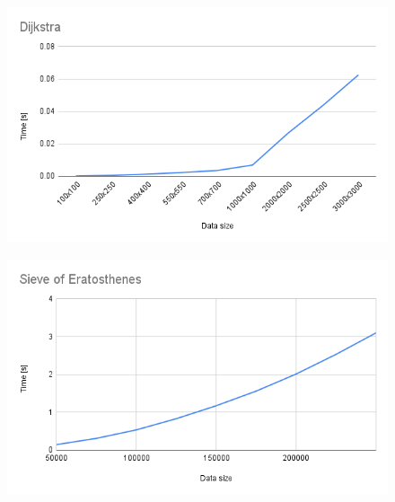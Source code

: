 \begin{minipage}{0.5\textwidth}
    \begin{figure}[H]
        \centering
        \includegraphics[width=1.0\textwidth]{content/Dijkstra.png}
        \label{fig:Dijkstra}
    \end{figure}
\end{minipage}
\begin{minipage}{0.5\textwidth}
    \begin{figure}[H]
        \centering
        \includegraphics[width=1.0\textwidth]{content/Sieve_of_Eratosthenes.png}
        \label{fig:Sieve_of_Eratosthenes}
    \end{figure}
\end{minipage}
